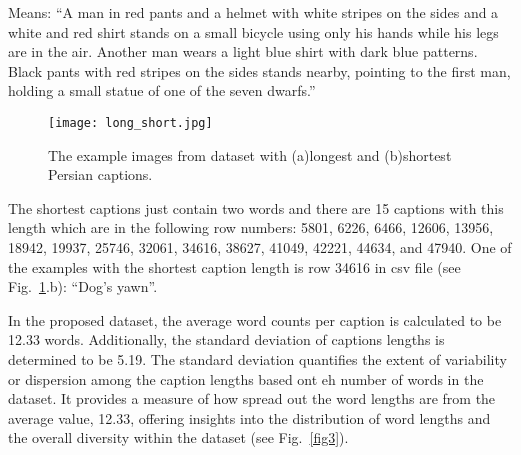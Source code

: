 \documentclass[runningheads]{llncs}
\begin{document}
Means: ``A man in red pants and a helmet with white stripes on the sides and a white and red shirt stands on a small bicycle using only his hands while his legs are in the air. Another man wears a light blue shirt with dark blue patterns. Black pants with red stripes on the sides stands nearby, pointing to the first man, holding a small statue of one of the seven dwarfs.''
\vspace{-\baselineskip}
\begin{figure}
  \begin{center}
    \texttt{[image: long\_short.jpg]}
    \caption{The example images from dataset with (a)longest and (b)shortest Persian captions.} \label{fig2}
  \end{center}
\end{figure}
\vspace{-\baselineskip}
The shortest captions just contain two words and there are 15 captions with this length which are in the following row numbers: 5801, 6226, 6466, 12606, 13956, 18942, 19937, 25746, 32061, 34616, 38627, 41049, 42221, 44634, and 47940. One of the examples with the shortest caption length is row 34616 in csv file (see Fig.~\ref{fig2}.b): ``Dog's yawn''.

In the proposed dataset, the average word counts per caption is calculated to be 12.33 words. Additionally, the standard deviation of captions lengths is determined to be 5.19. The standard deviation quantifies the extent of variability or dispersion among the caption lengths based ont eh number of words in the dataset. It provides a measure of how spread out the word lengths are from the average value, 12.33, offering insights into the distribution of word lengths and the overall diversity within the dataset (see Fig.~\ref{fig3}).
\end{document}
